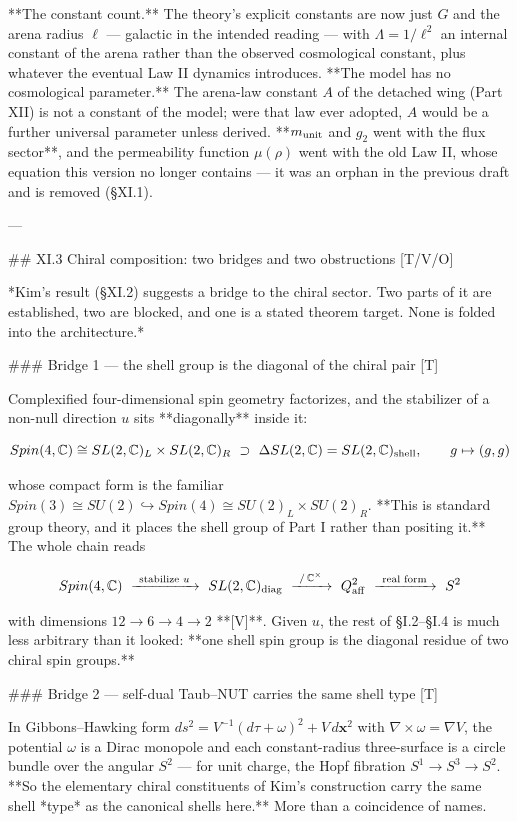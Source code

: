 **The constant count.** The theory's explicit constants are now just $G$ and the arena radius $\ell$ — galactic in the intended reading — with $\Lambda = 1/\ell^2$ an internal constant of the arena rather than the observed cosmological constant, plus whatever the eventual Law II dynamics introduces. **The model has no cosmological parameter.** The arena-law constant $A$ of the detached wing (Part XII) is not a constant of the model; were that law ever adopted, $A$ would be a further universal parameter unless derived. **$m_{\rm unit}$ and $g_2$ went with the flux sector**, and the permeability function $\mu(\rho)$ went with the old Law II, whose equation this version no longer contains — it was an orphan in the previous draft and is removed (§XI.1).

---

## XI.3 Chiral composition: two bridges and two obstructions [T/V/O]

*Kim's result (§XI.2) suggests a bridge to the chiral sector. Two parts of it are established, two are blocked, and one is a stated theorem target. None is folded into the architecture.*

### Bridge 1 — the shell group is the diagonal of the chiral pair [T]

Complexified four-dimensional spin geometry factorizes, and the stabilizer of a non-null direction $u$ sits **diagonally** inside it:

$$Spin(4,\mathbb{C})\cong SL(2,\mathbb{C})_L\times SL(2,\mathbb{C})_R\ \supset\ \Delta SL(2,\mathbb{C}) = SL(2,\mathbb{C})_{\rm shell},\qquad g\mapsto(g,g)$$

whose compact form is the familiar $Spin(3)\cong SU(2)\hookrightarrow Spin(4)\cong SU(2)_L\times SU(2)_R$. **This is standard group theory, and it places the shell group of Part I rather than positing it.** The whole chain reads

$$Spin(4,\mathbb{C})\ \xrightarrow{\ \text{stabilize }u\ }\ SL(2,\mathbb{C})_{\rm diag}\ \xrightarrow{\ /\,\mathbb{C}^\times\ }\ Q^2_{\rm aff}\ \xrightarrow{\ \text{real form}\ }\ S^2$$

with dimensions $12\to6\to4\to2$ **[V]**. Given $u$, the rest of §I.2–§I.4 is much less arbitrary than it looked: **one shell spin group is the diagonal residue of two chiral spin groups.**

### Bridge 2 — self-dual Taub–NUT carries the same shell type [T]

In Gibbons–Hawking form $ds^2 = V^{-1}(d\tau+\omega)^2+V\,d\mathbf{x}^2$ with $\nabla\times\omega = \nabla V$, the potential $\omega$ is a Dirac monopole and each constant-radius three-surface is a circle bundle over the angular $S^2$ — for unit charge, the Hopf fibration $S^1\to S^3\to S^2$. **So the elementary chiral constituents of Kim's construction carry the same shell *type* as the canonical shells here.** More than a coincidence of names.


